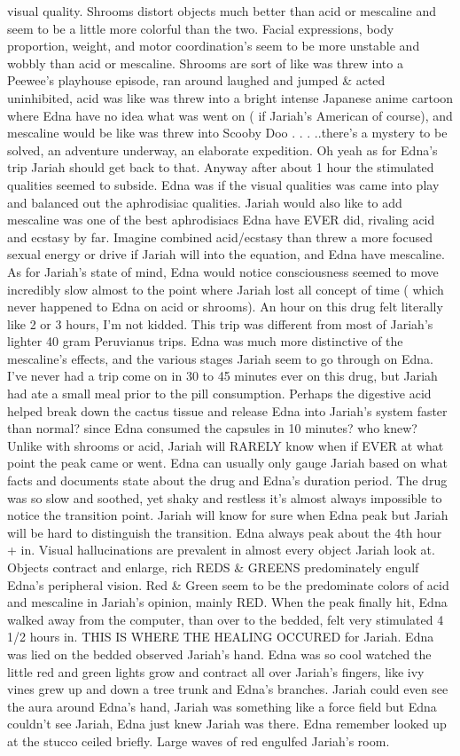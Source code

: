 \documentclass[12pt]{book}
\begin{document}
visual quality. Shrooms distort objects much better than acid or mescaline and seem to be a little more colorful than the two. Facial expressions, body proportion, weight, and motor coordination's seem to be more unstable and wobbly than acid or mescaline. Shrooms are sort of like was threw into a Peewee's playhouse episode, ran around laughed and jumped \& acted uninhibited, acid was like was threw into a bright intense Japanese anime cartoon where Edna have no idea what was went on ( if Jariah's American of course), and mescaline would be like was threw into Scooby Doo . . .  ..there's a mystery to be solved, an adventure underway, an elaborate expedition. Oh yeah as for Edna's trip Jariah should get back to that. Anyway after about 1 hour the stimulated qualities seemed to subside. Edna was if the visual qualities was came into play and balanced out the aphrodisiac qualities. Jariah would also like to add mescaline was one of the best aphrodisiacs Edna have EVER did, rivaling acid and ecstasy by far. Imagine combined acid/ecstasy than threw a more focused sexual energy or drive if Jariah will into the equation, and Edna have mescaline. As for Jariah's state of mind, Edna would notice consciousness seemed to move incredibly slow almost to the point where Jariah lost all concept of time ( which never happened to Edna on acid or shrooms). An hour on this drug felt literally like 2 or 3 hours, I'm not kidded. This trip was different from most of Jariah's lighter 40 gram Peruvianus trips. Edna was much more distinctive of the mescaline's effects, and the various stages Jariah seem to go through on Edna. I've never had a trip come on in 30 to 45 minutes ever on this drug, but Jariah had ate a small meal prior to the pill consumption. Perhaps the digestive acid helped break down the cactus tissue and release Edna into Jariah's system faster than normal? since Edna consumed the capsules in 10 minutes? who knew? Unlike with shrooms or acid, Jariah will RARELY know when if EVER at what point the peak came or went. Edna can usually only gauge Jariah based on what facts and documents state about the drug and Edna's duration period. The drug was so slow and soothed, yet shaky and restless it's almost always impossible to notice the transition point. Jariah will know for sure when Edna peak but Jariah will be hard to distinguish the transition. Edna always peak about the 4th hour + in. Visual hallucinations are prevalent in almost every object Jariah look at. Objects contract and enlarge, rich REDS \& GREENS predominately engulf Edna's peripheral vision. Red \& Green seem to be the predominate colors of acid and mescaline in Jariah's opinion, mainly RED. When the peak finally hit, Edna walked away from the computer, than over to the bedded, felt very stimulated 4 1/2 hours in. THIS IS WHERE THE HEALING OCCURED for Jariah. Edna was lied on the bedded observed Jariah's hand. Edna was so cool watched the little red and green lights grow and contract all over Jariah's fingers, like ivy vines grew up and down a tree trunk and Edna's branches. Jariah could even see the aura around Edna's hand, Jariah was something like a force field but Edna couldn't see Jariah, Edna just knew Jariah was there. Edna remember looked up at the stucco ceiled briefly. Large waves of red engulfed Jariah's room. 
\end{document}
